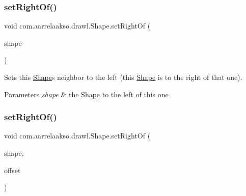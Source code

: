 \subsubsection{\texorpdfstring{set\+Right\+Of()}{setRightOf()}\hspace{0.1cm}{\footnotesize\ttfamily [1/2]}}
{\footnotesize\ttfamily void com.\+aarrelaakso.\+drawl.\+Shape.\+set\+Right\+Of (\begin{DoxyParamCaption}\item[{@Not\+Null final \hyperlink{classcom_1_1aarrelaakso_1_1drawl_1_1_shape}{Shape}}]{shape }\end{DoxyParamCaption})\hspace{0.3cm}{\ttfamily [inherited]}}



Sets this \hyperlink{classcom_1_1aarrelaakso_1_1drawl_1_1_shape}{Shape}\textquotesingle{}s neighbor to the left (this \hyperlink{classcom_1_1aarrelaakso_1_1drawl_1_1_shape}{Shape} is to the right of that one). 


\begin{DoxyParams}{Parameters}
{\em shape} & the \hyperlink{classcom_1_1aarrelaakso_1_1drawl_1_1_shape}{Shape} to the left of this one \\
\hline
\end{DoxyParams}
\mbox{\label{classcom_1_1aarrelaakso_1_1drawl_1_1_shape_a89e85848d24dca0fa60ff68d169eef11}} 
\subsubsection{\texorpdfstring{set\+Right\+Of()}{setRightOf()}\hspace{0.1cm}{\footnotesize\ttfamily [2/2]}}
{\footnotesize\ttfamily void com.\+aarrelaakso.\+drawl.\+Shape.\+set\+Right\+Of (\begin{DoxyParamCaption}\item[{@Not\+Null final \hyperlink{classcom_1_1aarrelaakso_1_1drawl_1_1_shape}{Shape}}]{shape,  }\item[{@Not\+Null final \hyperlink{classcom_1_1aarrelaakso_1_1drawl_1_1_measure}{Measure}}]{offset }\end{DoxyParamCaption})\hspace{0.3cm}{\ttfamily [inherited]}}




